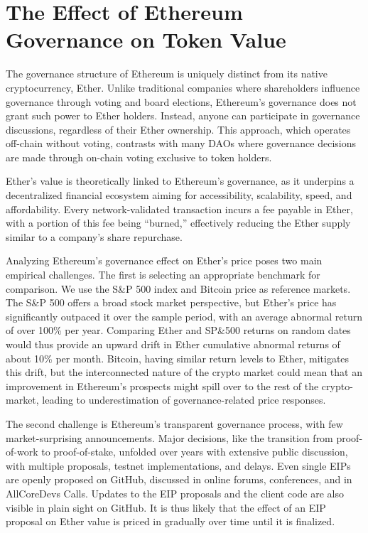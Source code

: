 \documentclass[No]{AEA}
\begin{document}
\section{The Effect of Ethereum Governance on Token Value}

The governance structure of Ethereum is uniquely distinct from its native cryptocurrency, Ether. Unlike traditional companies where shareholders influence governance through voting and board elections, Ethereum's governance does not grant such power to Ether holders. Instead, anyone can participate in governance discussions, regardless of their Ether ownership. This approach, which operates off-chain without voting, contrasts with many DAOs where governance decisions are made through on-chain voting exclusive to token holders.

Ether's value is theoretically linked to Ethereum's governance, as it underpins a decentralized financial ecosystem aiming for accessibility, scalability, speed, and affordability. Every network-validated transaction incurs a fee payable in Ether, with a portion of this fee being ``burned,'' effectively reducing the Ether supply similar to a company's share repurchase.

Analyzing Ethereum's governance effect on Ether's price poses two main empirical challenges. The first is selecting an appropriate benchmark for comparison. We use the S\&P 500 index and Bitcoin price as reference markets. The S\&P 500 offers a broad stock market perspective, but Ether's price has significantly outpaced it over the sample period, with an average abnormal return of over 100\% per year. Comparing Ether and SP\&500 returns on random dates would thus provide an upward drift in Ether cumulative abnormal returns of about 10\% per month.  Bitcoin, having similar return levels to Ether, mitigates this drift, but the interconnected nature of the crypto market could mean that an improvement in Ethereum's prospects might spill over to the rest of the crypto-market, leading to underestimation of governance-related price responses.

The second challenge is Ethereum's transparent governance process, with few market-surprising announcements. Major decisions, like the transition from proof-of-work to proof-of-stake, unfolded over years with extensive public discussion, with multiple proposals, testnet implementations, and delays. Even single EIPs are openly proposed on GitHub, discussed in online forums, conferences, and in AllCoreDevs Calls. Updates to the EIP proposals and the client code are also visible in plain sight on GitHub. It is thus likely that the effect of an EIP proposal on Ether value is priced in gradually over time until it is finalized.
 
\end{document}
